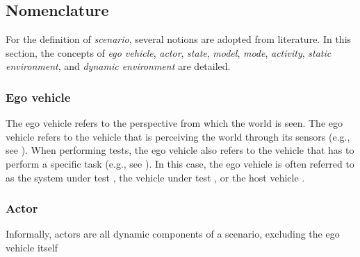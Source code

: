 


\subsection{Nomenclature}
\label{sec:nomenclature}

For the definition of \emph{scenario}, several notions are adopted from literature. In this section, the concepts of \emph{ego vehicle}, \emph{actor}, \emph{state}, \emph{model}, \emph{mode}, \emph{activity}, \emph{static environment}, and \emph{dynamic environment} are detailed. 

\subsubsection{Ego vehicle}
\label{sec:ego vehicle}
The ego vehicle refers to the perspective from which the world is seen. The ego vehicle refers to the vehicle that is perceiving the world through its sensors (e.g., see \cite{Bonnin2014}). When performing tests, the ego vehicle also refers to the vehicle that has to perform a specific task (e.g., see \cite{althoff2017CommonRoad}). In this case, the ego vehicle is often referred to as the system under test \cite{stellet2015taxonomy}, the vehicle under test \cite{gietelink2006development}, or the host vehicle \cite{gietelink2006development}.

\subsubsection{Actor}
\label{sec:actor}
Informally, actors are all dynamic components of a scenario, excluding the ego vehicle itself\cite{catapult2018musicc}

